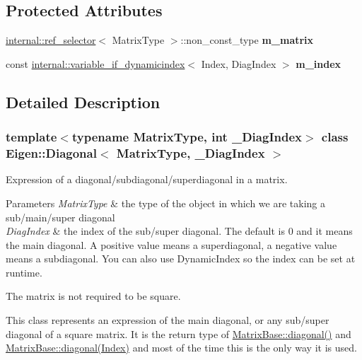 \subsection*{Protected Attributes}
\begin{DoxyCompactItemize}
\item 
\mbox{\label{class_eigen_1_1_diagonal_ab72a0db36bf9e32e70ce6732e47375cf}} 
\mbox{\hyperlink{struct_eigen_1_1internal_1_1ref__selector}{internal\+::ref\+\_\+selector}}$<$ Matrix\+Type $>$\+::non\+\_\+const\+\_\+type {\bfseries m\+\_\+matrix}
\item 
\mbox{\label{class_eigen_1_1_diagonal_a1101bacfc786c23f741df18774298da9}} 
const \mbox{\hyperlink{class_eigen_1_1internal_1_1variable__if__dynamicindex}{internal\+::variable\+\_\+if\+\_\+dynamicindex}}$<$ Index, Diag\+Index $>$ {\bfseries m\+\_\+index}
\end{DoxyCompactItemize}


\subsection{Detailed Description}
\subsubsection*{template$<$typename Matrix\+Type, int \+\_\+\+Diag\+Index$>$\newline
class Eigen\+::\+Diagonal$<$ Matrix\+Type, \+\_\+\+Diag\+Index $>$}

Expression of a diagonal/subdiagonal/superdiagonal in a matrix. 


\begin{DoxyParams}{Parameters}
{\em Matrix\+Type} & the type of the object in which we are taking a sub/main/super diagonal \\
\hline
{\em Diag\+Index} & the index of the sub/super diagonal. The default is 0 and it means the main diagonal. A positive value means a superdiagonal, a negative value means a subdiagonal. You can also use Dynamic\+Index so the index can be set at runtime.\\
\hline
\end{DoxyParams}
The matrix is not required to be square.

This class represents an expression of the main diagonal, or any sub/super diagonal of a square matrix. It is the return type of \mbox{\hyperlink{class_eigen_1_1_matrix_base_ab5768147536273eb2dbdfa389cfd26a3}{Matrix\+Base\+::diagonal()}} and \mbox{\hyperlink{class_eigen_1_1_matrix_base_a8a13d4b8efbd7797ee8efd3dd988a7f7}{Matrix\+Base\+::diagonal(\+Index)}} and most of the time this is the only way it is used.

